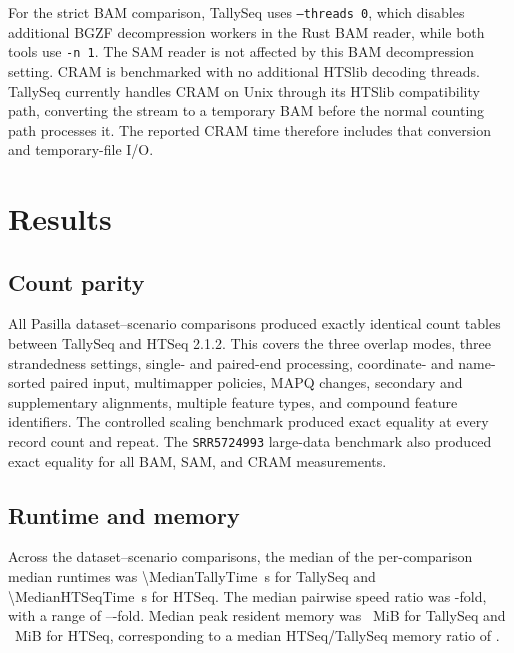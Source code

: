 \documentclass[11pt]{article}
\begin{document}
For the strict BAM comparison, TallySeq uses \texttt{--threads 0}, which disables additional BGZF decompression workers in the Rust BAM reader, while both tools use \texttt{-n 1}. The SAM reader is not affected by this BAM decompression setting. CRAM is benchmarked with no additional HTSlib decoding threads. TallySeq currently handles CRAM on Unix through its HTSlib compatibility path, converting the stream to a temporary BAM before the normal counting path processes it. The reported CRAM time therefore includes that conversion and temporary-file I/O.

\section{Results}

\subsection{Count parity}

All \BenchmarkDatasetScenarioCount{} Pasilla dataset--scenario comparisons produced exactly identical count tables between TallySeq and HTSeq 2.1.2. This covers the three overlap modes, three strandedness settings, single- and paired-end processing, coordinate- and name-sorted paired input, multimapper policies, MAPQ changes, secondary and supplementary alignments, multiple feature types, and compound feature identifiers. The controlled scaling benchmark produced exact equality at every record count and repeat. The \texttt{SRR5724993} large-data benchmark also produced exact equality for all BAM, SAM, and CRAM measurements.

\subsection{Runtime and memory}

Across the \BenchmarkDatasetScenarioCount{} dataset--scenario comparisons, the median of the per-comparison median runtimes was \SI{\MedianTallyTime}{\second} for TallySeq and \SI{\MedianHTSeqTime}{\second} for HTSeq. The median pairwise speed ratio was \MedianSpeedup{}-fold, with a range of \MinimumSpeedup{}--\MaximumSpeedup{}-fold. Median peak resident memory was \MedianTallyRSS{}~MiB for TallySeq and \MedianHTSeqRSS{}~MiB for HTSeq, corresponding to a median HTSeq/TallySeq memory ratio of \MedianMemoryRatio{}.
\end{document}
